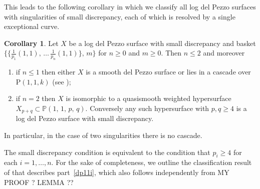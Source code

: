 \documentclass[11pt]{amsbook}
\theoremstyle{definition}
\theoremstyle{definition}
\newtheorem{cor}[thm]{Corollary}
\theoremstyle{definition}
\theoremstyle{definition}
\theoremstyle{definition}
\theoremstyle{definition}
\theoremstyle{definition}
\theoremstyle{definition}
\newcommand{\mb}[1]{\mathbb{#1}}
\renewcommand{\P}{\mathrm{P}}
\begin{document}
This leads to the following corollary in which we classify all log del Pezzo surfaces with singularities of small discrepancy, each of which is resolved by a single exceptional curve.
 
\begin{cor}
Let $X$ be a log del Pezzo surface with small discrepancy and
basket  $\{ \{ \frac{1}{p_1}(1,1), \, \dots \, \frac{1}{p_n}(1,1) \}, \, m \}$
for $n\ge0$ and $m\ge0$. Then $n\le2$ and moreover
\begin{enumerate}
\item\label{dp11i}
if $n\le1$ then either $X$ is a smooth del Pezzo surface or 
lies in a cascade over $\P(1,1,k)$ (see \cite[Table ??]{CP});
\item\label{dp11ii}
if $n=2$ then $X$
is isomorphic to a quasismooth weighted hypersurface
$X_{p+q}\subset \mb{P}(1,\,1,\,p,\,q)$. Conversely any such hypersurface with $p,q\ge4$ is
a log del Pezzo surface with small discrepancy.
\end{enumerate}
In particular, in the case of two singularities there is no cascade.
\end{cor}

The small discrepancy condition is equivalent to the condition that
$p_i \geq 4$ for each $i=1,\dots,n$. 
For the sake of completeness, we outline the classification result of \cite{CP} that
describes part~\ref{dp11i}, which also follows independently from MY PROOF ? LEMMA ??
\end{document}

